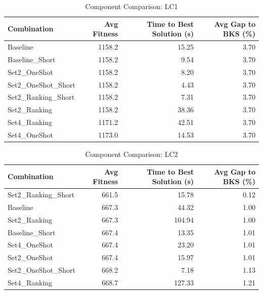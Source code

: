\documentclass{article}
\begin{document}
\begin{table}[htbp]
\centering
\caption{Component Comparison: LC1}
\label{tab:comparison_lc1}
\begin{tabular}{lrrr}
\toprule
Combination & Avg Fitness & Time to Best Solution (s) & Avg Gap to BKS (\%) \\
\midrule
Baseline & 1158.2 & 15.25 & 3.70 \\
Baseline\_Short & 1158.2 & 9.54 & 3.70 \\
Set2\_OneShot & 1158.2 & 8.20 & 3.70 \\
Set2\_OneShot\_Short & 1158.2 & 4.43 & 3.70 \\
Set2\_Ranking\_Short & 1158.2 & 7.31 & 3.70 \\
Set2\_Ranking & 1158.2 & 38.36 & 3.70 \\
Set4\_Ranking & 1171.2 & 42.51 & 3.70 \\
Set4\_OneShot & 1173.0 & 14.53 & 3.70 \\
\bottomrule
\end{tabular}
\end{table}

\begin{table}[htbp]
\centering
\caption{Component Comparison: LC2}
\label{tab:comparison_lc2}
\begin{tabular}{lrrr}
\toprule
Combination & Avg Fitness & Time to Best Solution (s) & Avg Gap to BKS (\%) \\
\midrule
Set2\_Ranking\_Short & 661.5 & 15.78 & 0.12 \\
Baseline & 667.3 & 44.32 & 1.00 \\
Set2\_Ranking & 667.3 & 104.94 & 1.00 \\
Baseline\_Short & 667.4 & 13.35 & 1.01 \\
Set4\_OneShot & 667.4 & 23.20 & 1.01 \\
Set2\_OneShot & 667.4 & 15.97 & 1.01 \\
Set2\_OneShot\_Short & 668.2 & 7.18 & 1.13 \\
Set4\_Ranking & 668.7 & 127.33 & 1.21 \\
\bottomrule
\end{tabular}
\end{table}
\end{document}
